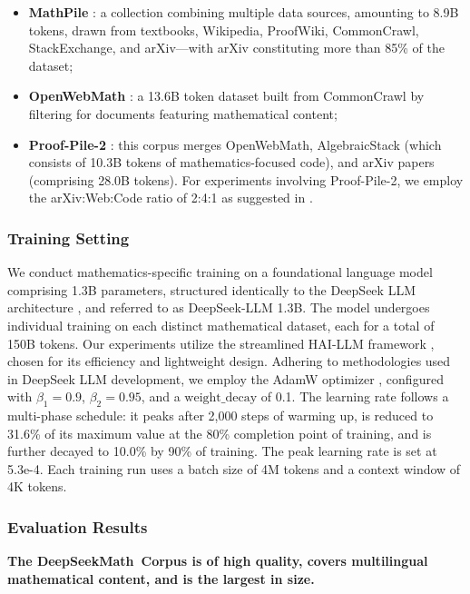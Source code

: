 \begin{itemize}[topsep=0pt]
\begin{itemize}[topsep=0pt]
    \item \textbf{MathPile} \citep{mathpile}: a collection combining multiple data sources, amounting to 8.9B tokens, drawn from textbooks, Wikipedia, ProofWiki, CommonCrawl, StackExchange, and arXiv—with arXiv constituting more than 85\% of the dataset;
    \item \textbf{OpenWebMath} \citep{openwebmath}: a 13.6B token dataset built from CommonCrawl by filtering for documents featuring mathematical content;
    \item \textbf{Proof-Pile-2} \citep{llemma}: this corpus merges OpenWebMath, AlgebraicStack (which consists of 10.3B tokens of mathematics-focused code), and arXiv papers (comprising 28.0B tokens). For experiments involving Proof-Pile-2, we employ the arXiv:Web:Code ratio of 2:4:1 as suggested in \cite{llemma}.
\end{itemize}

\subsubsection{Training Setting}
\label{sec:quality-policy}
We conduct mathematics-specific training on a foundational language model comprising 1.3B parameters, structured identically to the DeepSeek LLM architecture \citep{deepseek-llm}, and referred to as DeepSeek-LLM 1.3B. The model undergoes individual training on each distinct mathematical dataset, each for a total of 150B tokens. Our experiments utilize the streamlined HAI-LLM framework \citep{haillm}, chosen for its efficiency and lightweight design. Adhering to methodologies used in DeepSeek LLM development, we employ the AdamW optimizer \citep{adamW}, configured with $\beta_1=0.9$, $\beta_2=0.95$, and a $\mathrm{weight\_decay}$ of 0.1. The learning rate follows a multi-phase schedule: it peaks after 2,000 steps of warming up, is reduced to 31.6\% of its maximum value at the 80\% completion point of training, and is further decayed to 10.0\% by 90\% of training. The peak learning rate is set at 5.3e-4. Each training run uses a batch size of 4M tokens and a context window of 4K tokens.

\subsubsection{Evaluation Results}

\textbf{The DeepSeekMath~Corpus is of high quality, covers multilingual mathematical content, and is the largest in size.}


\end{itemize}
